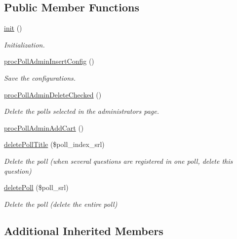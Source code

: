 \subsection*{Public Member Functions}
\begin{DoxyCompactItemize}
\item 
\hyperlink{classpollAdminController_adaf2c123a1f123bcb92de4f373ead8a9}{init} ()
\begin{DoxyCompactList}\small\item\em Initialization. \end{DoxyCompactList}\item 
\hyperlink{classpollAdminController_ab34f3cb8a5b40217ed0acdaaa11ee0ad}{proc\+Poll\+Admin\+Insert\+Config} ()
\begin{DoxyCompactList}\small\item\em Save the configurations. \end{DoxyCompactList}\item 
\hyperlink{classpollAdminController_af1a9c9f33253af68ac12e4c026bd699a}{proc\+Poll\+Admin\+Delete\+Checked} ()
\begin{DoxyCompactList}\small\item\em Delete the polls selected in the administrator\textquotesingle{}s page. \end{DoxyCompactList}\item 
\hyperlink{classpollAdminController_a148e3ec22f5a872647e7208bb853d3a1}{proc\+Poll\+Admin\+Add\+Cart} ()
\item 
\hyperlink{classpollAdminController_acd355746ff4a145b974b2a95b9c0eda9}{delete\+Poll\+Title} (\$poll\+\_\+index\+\_\+srl)
\begin{DoxyCompactList}\small\item\em Delete the poll (when several questions are registered in one poll, delete this question) \end{DoxyCompactList}\item 
\hyperlink{classpollAdminController_ab8fa4ab256e902120f27dac1edea8f57}{delete\+Poll} (\$poll\+\_\+srl)
\begin{DoxyCompactList}\small\item\em Delete the poll (delete the entire poll) \end{DoxyCompactList}\end{DoxyCompactItemize}
\subsection*{Additional Inherited Members}


